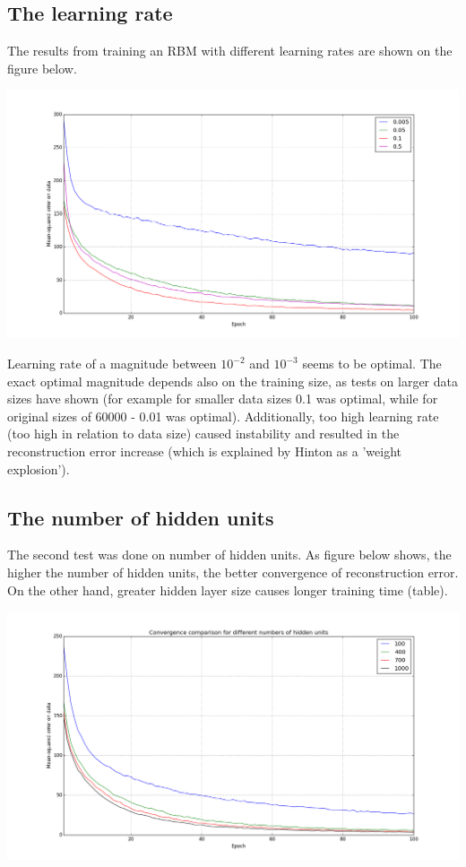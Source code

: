 \documentclass[a4paper]{scrartcl}
\begin{document}
\subsection{The learning rate}
\par The results from training an RBM with different learning rates are shown on the figure below.
\begin{center}
\includegraphics[width=14cm]{images/lr.png}
\end{center}
Learning rate of a magnitude between $10^{-2}$ and $10^{-3}$ seems to be optimal. The exact optimal magnitude depends also on the training size, as tests on larger data sizes have shown (for example for smaller data sizes 0.1 was optimal, while for original sizes of 60000 - 0.01 was optimal). Additionally, too high learning rate (too high in relation to data size) caused instability and resulted in the reconstruction error increase (which is explained by Hinton \cite{Hinton} as a 'weight explosion').
\subsection{The number of hidden units}
\par The second test was done on number of hidden units. As figure below shows, the higher the number of hidden units, the better convergence of reconstruction error. On the other hand, greater hidden layer size causes longer training time (table).
\begin{center}
\includegraphics[width=14cm]{images/hu.png}
\end{center}
\end{document}
